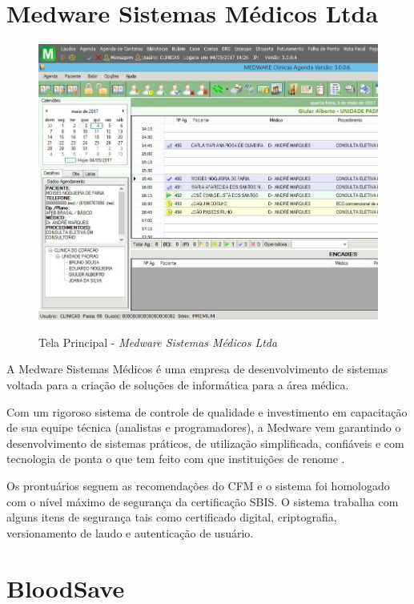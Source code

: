 \documentclass[portuguese,oneside]{tcc}
\begin{document}
\section{Medware Sistemas Médicos Ltda}

\begin{figure}[htp]
\centering
\caption{Tela Principal - \textit{Medware Sistemas Médicos Ltda}}
\includegraphics[width=12cm]{medware}
\label{fig:CalDoseX}
\end{figure}

A Medware Sistemas Médicos é uma empresa de desenvolvimento de sistemas voltada para a criação de soluções de informática para a área médica.

Com um rigoroso sistema de controle de qualidade e investimento em capacitação de sua equipe técnica (analistas e programadores), a Medware vem garantindo o desenvolvimento de sistemas práticos, de utilização simplificada, confiáveis e com tecnologia de ponta o que tem feito com que instituições de renome \cite{MEDWARE}.

Os prontuários seguem as recomendações do CFM e o sistema foi homologado com o nível máximo de segurança da certificação SBIS. O sistema trabalha com alguns itens de segurança tais como certificado digital, criptografia, versionamento de laudo e autenticação de usuário.


\newpage

\section{BloodSave}
\end{document}
